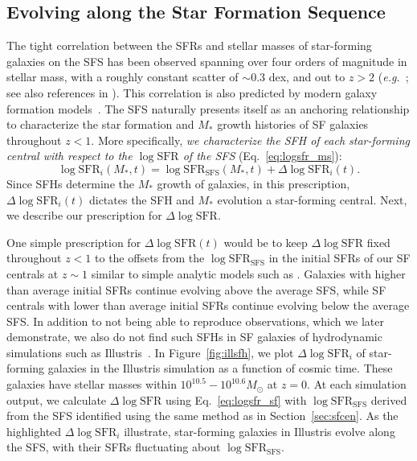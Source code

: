 \documentclass[12pt, letterpaper, preprint, tighten]{aastex62}
\newcommand{\beq}{\begin{equation}}
\newcommand{\eeq}{\end{equation}}
\newcommand{\logsfr}{\log\mathrm{SFR}}
\newcommand{\logsfrsfs}{\log\mathrm{SFR}_\mathrm{SFS}}
\begin{document}
\subsection{Evolving along the Star Formation Sequence} \label{sec:modelevol} 
The tight correlation between the SFRs and stellar masses of star-forming 
galaxies on the SFS has been observed spanning over four orders of magnitude 
in stellar mass, with a roughly constant scatter of ${\sim}0.3$ dex, and out 
to $z > 2$ 
(\emph{e.g.}~\citealt{noeske2007,daddi2007,elbaz2007,salim2007,santini2009,karim2011,whitaker2012,moustakas2013,lee2015}; see also references in \citealt{speagle2014}). 
This correlation is also predicted by modern galaxy formation models~\citep[][see 
\citealt{hahn2018a} and references therein]{somerville2015}. The SFS 
naturally presents itself as an anchoring relationship to characterize 
the star formation and $M_*$ growth histories of SF galaxies throughout $z < 1$. More 
specifically, \emph{we characterize the SFH of each star-forming central 
with respect to the $\logsfr$ of the SFS} (Eq.~\ref{eq:logsfr_ms}):
\beq \label{eq:logsfr_sf} 
\logsfr_i(M_*, t) = \logsfrsfs(M_*, t) + \Delta\logsfr_i(t).
\eeq
Since SFHs determine the $M_*$ growth of galaxies, in this prescription, 
$\Delta \logsfr_i(t)$ dictates the SFH and $M_*$ evolution a star-forming 
central. Next, we describe our prescription for $\Delta \logsfr$.

One simple prescription for $\Delta \logsfr(t)$ would be to keep $\Delta \logsfr$ 
fixed throughout $z < 1$ to the offsets from the $\logsfrsfs$ in the 
initial SFRs of our SF centrals at $z\sim1$ similar to simple analytic 
models such as \cite{mitra2015}. Galaxies with higher than average 
initial SFRs continue evolving above the average SFS, while SF centrals 
with lower than average initial SFRs continue evolving below the average 
SFS. In addition to not being able to reproduce observations, which we
later demonstrate, we also do not find such SFHs in SF galaxies of 
hydrodynamic simulations such as Illustris~\citep{vogelsberger2014,genel2014}. 
In Figure~\ref{fig:illsfh}, we plot $\Delta \logsfr_i$ of star-forming 
galaxies in the Illustris simulation as a function of cosmic time. These 
galaxies have stellar masses within $10^{10.5}-10^{10.6}M_\odot$ at $z=0$. 
At each simulation output, we calculate $\Delta \logsfr$ using Eq.~\ref{eq:logsfr_sf}
with $\logsfrsfs$ derived from the SFS identified using the same \cite{hahn2018a}
method as in Section~\ref{sec:sfcen}. As the highlighted $\Delta \logsfr_i$
illustrate, star-forming galaxies in Illustris evolve along the SFS, with
their SFRs fluctuating about $\logsfrsfs$.
\end{document}
